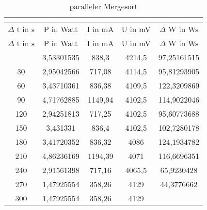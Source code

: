 \begin{longtable}[c]{ccccc}
\caption{paralleler Mergesort} \\
\label{tab:MergeSortMessungParallel}\\
\hline
{$\Delta$ t in s} & {P in Watt} & {I in mA} & {U in mV} & {$\Delta$ W in Ws} \\
\hline
\endfirsthead
\hline
$\Delta$ t in s & P in Watt & I in mA & U in mV & $\Delta$ W in Ws \\
\hline
\endhead
\hline
\endfoot
\hline
      \midrule
    0     & 3,53301535 & 838,3 & 4214,5 & 97,25161515 \\
    \midrule
    30    & 2,95042566 & 717,08 & 4114,5 & 95,81293905 \\
    \midrule
    60    & 3,43710361 & 836,38 & 4109,5 & 122,3209869 \\
    \midrule
    90    & 4,71762885 & 1149,94 & 4102,5 & 114,9022046 \\
    \midrule
    120   & 2,94251813 & 717,25 & 4102,5 & 95,60773688 \\
    \midrule
    150   & 3,431331 & 836,4 & 4102,5 & 102,7280178 \\
    \midrule
    180   & 3,41720352 & 836,32 & 4086  & 124,1934782 \\
    \midrule
    210   & 4,86236169 & 1194,39 & 4071  & 116,6696351 \\
    \midrule
    240   & 2,91561398 & 717,16 & 4065,5 & 65,9230428 \\
    \midrule
    270   & 1,47925554 & 358,26 & 4129  & 44,3776662 \\
    \midrule
    300   & 1,47925554 & 358,26 & 4129  &  \\
\end{longtable}